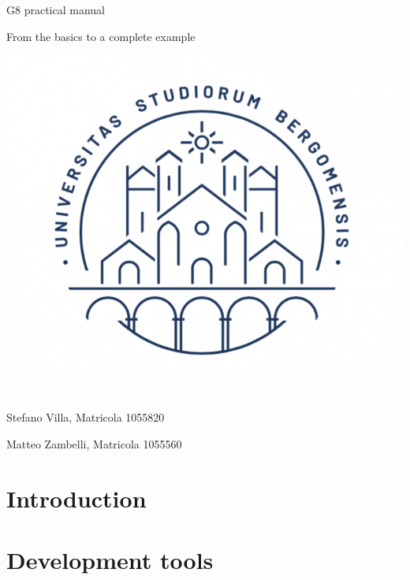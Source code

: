 \documentclass[a4paper]{article}
\begin{document}
\begin{center}
\begin{Huge}
G8 practical manual
\end{Huge}
\end{center}
\begin{center}
\begin{Large}
From the basics to a complete example
\end{Large}
\end{center}

\includegraphics[scale=1]{UniBG.png}
\\
\\
\begin{Large}
\begin{flushright}
Stefano Villa, Matricola 1055820

Matteo Zambelli, Matricola 1055560
\end{flushright}
\end{Large}

\newpage
\tableofcontents
\newpage

\section{Introduction}

\newpage

\section{Development tools}
\end{document}
